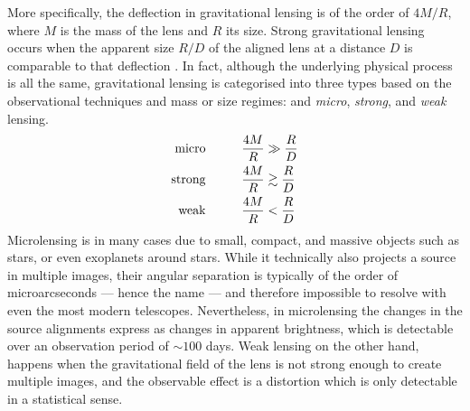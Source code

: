 More specifically, the deflection in gravitational lensing is of the order of
$4M/R$, where $M$ is the mass of the lens and $R$ its size.  Strong
gravitational lensing occurs when the apparent size $R/D$ of the aligned lens at
a distance $D$ is comparable to that deflection .  In fact,
although the underlying physical process is all the same, gravitational lensing
is categorised into three types based on the observational techniques and mass
or size regimes: and \textit{micro}, \textit{strong}, and \textit{weak} lensing.
%
\begin{equation}\eqlbl{lensing_types}%
  \begin{aligned}
    \text{micro} \hspace{1cm}&\frac{4M}{R} \gg \frac{R}{D}\\
    \text{strong} \hspace{1cm}&\frac{4M}{R} \gtrsim \frac{R}{D}\\
    \text{weak} \hspace{1cm}&\frac{4M}{R} < \frac{R}{D}
  \end{aligned}
\end{equation}%
%
Microlensing is in many cases due to small, compact, and massive objects such as
stars, or even exoplanets around stars.  While it technically also projects a
source in multiple images, their angular separation is typically of the order of
microarcseconds --- hence the name --- and therefore impossible to resolve with
even the most modern telescopes. Nevertheless, in microlensing the changes in
the source alignments express as changes in apparent brightness, which is
detectable over an observation period of $\sim100$ days.  Weak lensing on the
other hand, happens when the gravitational field of the lens is not strong
enough to create multiple images, and the observable effect is a distortion
which is only detectable in a statistical sense.

